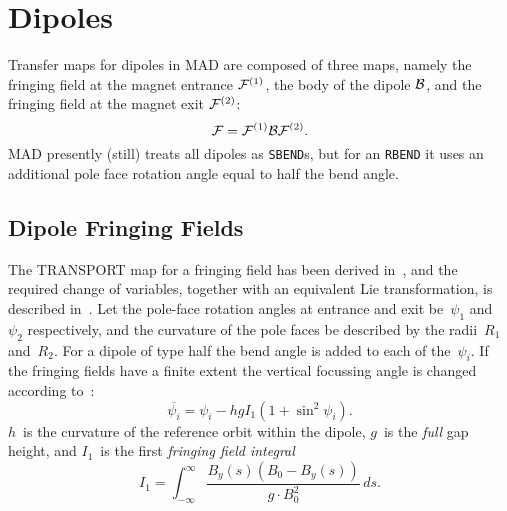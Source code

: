  
\section{Dipoles}
\label{dipole}
Transfer maps for dipoles in MAD are composed of three maps,
namely the fringing field at the magnet entrance ${\cal F}^{(1)}$,
the body of the dipole ${\cal B}$, 
and the fringing field at the magnet exit ${\cal F}^{(2)}$:
\begin{equation}
{\cal F} = {\cal F}^{(1)} {\cal B} {\cal F}^{(2)}.
\end{equation}
MAD presently (still) treats all dipoles as {\tt SBEND}s,
but for an {\tt RBEND} it uses an additional pole face rotation angle 
equal to half the bend angle.
 
\subsection{Dipole Fringing Fields}
The TRANSPORT map for a fringing field has been derived in~\cite{SLAC75},
and the required change of variables,
together with an equivalent Lie transformation,
is described in~\cite{ISE85}.
Let the pole-face rotation angles at entrance and exit be~$\psi_1$
and~$\psi_2$ respectively,
and the curvature of the pole faces be described by the radii~$R_1$
and~$R_2$.
For a dipole of type  half the bend angle is added to each
of the~$\psi_i$.
If the fringing fields have a finite extent the vertical focussing
angle is changed according to~\cite{SLAC75}:
\begin{equation}
\overline{\psi_i} = \psi_i - h g I_1 (1 + \sin^2\psi_i).
\end{equation}
$h$~is the curvature of the reference orbit within the dipole,
$g$~is the {\em full} gap height, 
and $I_1$~is the first {\em fringing field integral}
\begin{equation}
I_1=\int_{-\infty}^{\infty}\frac{B_y(s)(B_0-B_y(s))}{g\cdot B_0^2}\,ds.
\end{equation}
 
